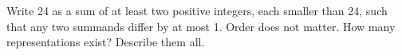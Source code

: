 Write 24 as a sum of at least two positive integers, each smaller than 24, such that any two summands differ by at most 1. Order does not matter. How many representations exist? Describe them all.
